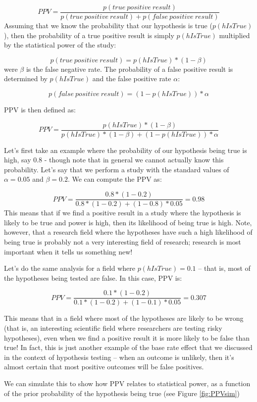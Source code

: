 \documentclass[]{book}
\theoremstyle{definition}
\theoremstyle{definition}
\theoremstyle{definition}
\theoremstyle{remark}
\begin{document}
\[
PPV = \frac{p(true\ positive\ result)}{p(true\ positive\ result) + p(false\ positive\ result)}
\] Assuming that we know the probability that our hypothesis is true
(\(p(hIsTrue)\)), then the probability of a true positive result is
simply \(p(hIsTrue)\) multiplied by the statistical power of the study:

\[
p(true\ positive\ result) = p(hIsTrue) * (1 - \beta)
\] were \(\beta\) is the false negative rate. The probability of a false
positive result is determined by \(p(hIsTrue)\) and the false positive
rate \(\alpha\):

\[
p(false\ positive\ result) = (1 - p(hIsTrue)) * \alpha
\]

PPV is then defined as:

\[
PPV = \frac{p(hIsTrue) * (1 - \beta)}{p(hIsTrue) * (1 - \beta) + (1 - p(hIsTrue)) * \alpha}
\]

Let's first take an example where the probability of our hypothesis
being true is high, say 0.8 - though note that in general we cannot
actually know this probability. Let's say that we perform a study with
the standard values of \(\alpha=0.05\) and \(\beta=0.2\). We can compute
the PPV as:

\[
PPV = \frac{0.8 * (1 - 0.2)}{0.8 * (1 - 0.2) + (1 - 0.8) * 0.05} = 0.98
\] This means that if we find a positive result in a study where the
hypothesis is likely to be true and power is high, then its likelihood
of being true is high. Note, however, that a research field where the
hypotheses have such a high likelihood of being true is probably not a
very interesting field of research; research is most important when it
tells us something new!

Let's do the same analysis for a field where \(p(hIsTrue)=0.1\) -- that
is, most of the hypotheses being tested are false. In this case, PPV is:

\[
PPV = \frac{0.1 * (1 - 0.2)}{0.1 * (1 - 0.2) + (1 - 0.1) * 0.05} = 0.307
\]

This means that in a field where most of the hypotheses are likely to be
wrong (that is, an interesting scientific field where researchers are
testing risky hypotheses), even when we find a positive result it is
more likely to be false than true! In fact, this is just another example
of the base rate effect that we discussed in the context of hypothesis
testing -- when an outcome is unlikely, then it's almost certain that
most positive outcomes will be false positives.

We can simulate this to show how PPV relates to statistical power, as a
function of the prior probability of the hypothesis being true (see
Figure \ref{fig:PPVsim})
\end{document}
